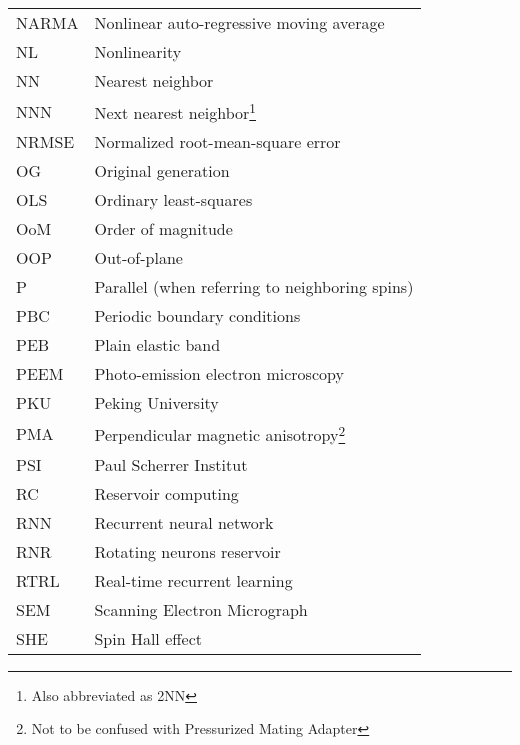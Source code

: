 {\begin{longtable}[l]{ll}
        NARMA & Nonlinear auto-regressive moving average    \\
        NL    & Nonlinearity                                \\
        NN    & Nearest neighbor                            \\
        NNN   & Next nearest neighbor\footnote{Also abbreviated as 2NN} \\ %
        NRMSE & Normalized root-mean-square error           \\
        OG    & Original generation                         \\
        OLS   & Ordinary least-squares                      \\
        OoM   & Order of magnitude                          \\
        OOP   & Out-of-plane                                \\
        P     & Parallel (when referring to neighboring spins) \\
        PBC   & Periodic boundary conditions                \\
        PEB   & Plain elastic band                          \\
        PEEM  & Photo-emission electron microscopy          \\
        PKU   & Peking University                           \\
        PMA   & Perpendicular magnetic anisotropy\footnote{Not to be confused with Pressurized Mating Adapter} \\
        PSI   & Paul Scherrer Institut                      \\
        RC    & Reservoir computing                         \\
        RNN   & Recurrent neural network                    \\
        RNR   & Rotating neurons reservoir                  \\
        RTRL  & Real-time recurrent learning                \\
        SEM   & Scanning Electron Micrograph                \\
        SHE   & Spin Hall effect~\cite{SHE}                 \\ %

\end{longtable}}
